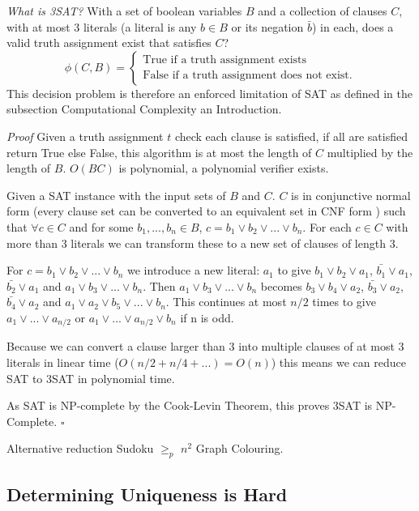 \documentclass[a4paper,12pt]{article}
\begin{document}
\textit{What is 3SAT?} With a set of boolean variables $B$ and a collection of clauses $C$, with at most 3 literals (a literal is any $b \in B$ or its negation $\bar{b}$) in each, does a valid truth assignment exist that satisfies $C$?
		\begin{equation}
		        \phi (C,B) = \begin{cases}
		            \text{True if a truth assignment exists} \\
		            \text{False if a truth assignment does not exist}.
				\end{cases}
		\end{equation}
This decision problem is therefore an enforced limitation of SAT as defined in the subsection Computational Complexity an Introduction.

		\textit{Proof}
Given a truth assignment $t$ check each clause is satisfied, if all are satisfied return True else False, this algorithm is at most the length of $C$ multiplied by the length of $B$. $O(BC)$ is polynomial, a polynomial verifier exists. 

Given a SAT instance with the input sets of $B$ and $C$. $C$ is in conjunctive normal form (every clause set can be converted to an equivalent set in CNF form \cite{CNF}) such that $\forall c \in C$ and for some $b_1, ... ,b_n \in B$, $c = b_1 \lor b_2 \lor ... \lor b_n$. For each $c \in C$ with more than 3 literals we can transform these to a new set of clauses of length 3. 

For $c = b_1 \lor b_2 \lor ... \lor b_n$ we introduce a new literal: $a_1$ to give $b_1 \lor b_2 \lor a_1$, $\bar{b_1} \lor a_1$, $\bar{b_2} \lor a_1$ and $a_1 \lor b_3 \lor ... \lor b_n$. Then $a_1 \lor b_3 \lor ... \lor b_n$ becomes $b_3 \lor b_4 \lor a_2$, $\bar{b_3} \lor a_2$, $\bar{b_4} \lor a_2$ and $a_1 \lor a_2 \lor b_5 \lor ... \lor b_n$. This continues at most $n/2$ times to give $a_1 \lor ... \lor a_{n/2}$ or $a_1 \lor ... \lor a_{n/2} \lor b_n$ if n is odd. 

Because we can convert a clause larger than 3 into multiple clauses of at most 3 literals in linear time ($O(n/2 + n/4 + ...) = O(n)$) this means we can reduce SAT to 3SAT in polynomial time. 

As SAT is NP-complete by the Cook-Levin Theorem, this proves 3SAT is NP-Complete. $\square$
		
Alternative reduction Sudoku $\geq_p$  $n^2$ Graph Colouring.

	\subsection{Determining Uniqueness is Hard}
\end{document}
